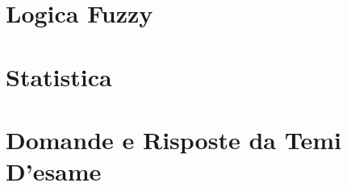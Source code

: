 \providecommand{\main}{.}








{\hypersetup{hidelinks}
	\tableofcontents  %
}

%

\chapter{Logica Fuzzy}


\chapter{Statistica}



\appendix
\chapter{Domande e Risposte da Temi D'esame}




